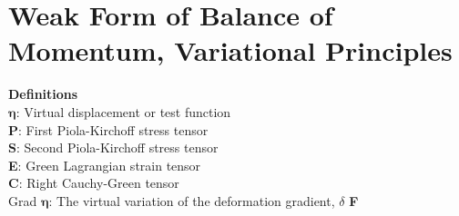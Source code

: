 \documentclass[12pt,3p]{article}
\numberwithin{equation}{section}
\begin{document}
\section{Weak Form of Balance of Momentum, Variational Principles}
\textbf{Definitions} \\
$\pmb{\eta}$: Virtual displacement or test function \\
$\mathbf{P}$: First Piola-Kirchoff stress tensor \\
$\mathbf{S}$: Second Piola-Kirchoff stress tensor \\
\textbf{E}: Green Lagrangian strain tensor \\
\textbf{C}: Right Cauchy-Green tensor \\
Grad $\pmb{\eta}$: The virtual variation of the deformation gradient, $\delta$ \textbf{F} \\
\end{document}
